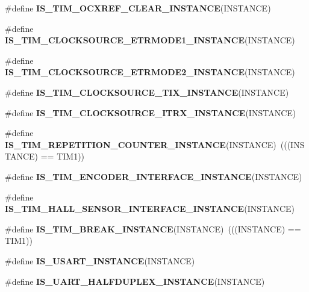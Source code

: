 \begin{DoxyCompactItemize}
\item 
\#define {\bfseries I\+S\+\_\+\+T\+I\+M\+\_\+\+O\+C\+X\+R\+E\+F\+\_\+\+C\+L\+E\+A\+R\+\_\+\+I\+N\+S\+T\+A\+N\+CE}(I\+N\+S\+T\+A\+N\+CE)
\item 
\#define {\bfseries I\+S\+\_\+\+T\+I\+M\+\_\+\+C\+L\+O\+C\+K\+S\+O\+U\+R\+C\+E\+\_\+\+E\+T\+R\+M\+O\+D\+E1\+\_\+\+I\+N\+S\+T\+A\+N\+CE}(I\+N\+S\+T\+A\+N\+CE)
\item 
\#define {\bfseries I\+S\+\_\+\+T\+I\+M\+\_\+\+C\+L\+O\+C\+K\+S\+O\+U\+R\+C\+E\+\_\+\+E\+T\+R\+M\+O\+D\+E2\+\_\+\+I\+N\+S\+T\+A\+N\+CE}(I\+N\+S\+T\+A\+N\+CE)
\item 
\#define {\bfseries I\+S\+\_\+\+T\+I\+M\+\_\+\+C\+L\+O\+C\+K\+S\+O\+U\+R\+C\+E\+\_\+\+T\+I\+X\+\_\+\+I\+N\+S\+T\+A\+N\+CE}(I\+N\+S\+T\+A\+N\+CE)
\item 
\#define {\bfseries I\+S\+\_\+\+T\+I\+M\+\_\+\+C\+L\+O\+C\+K\+S\+O\+U\+R\+C\+E\+\_\+\+I\+T\+R\+X\+\_\+\+I\+N\+S\+T\+A\+N\+CE}(I\+N\+S\+T\+A\+N\+CE)
\item 
\mbox{\label{group___exported__macros_ga3b470612fd4c4e29fb985247056b1e07}} 
\#define {\bfseries I\+S\+\_\+\+T\+I\+M\+\_\+\+R\+E\+P\+E\+T\+I\+T\+I\+O\+N\+\_\+\+C\+O\+U\+N\+T\+E\+R\+\_\+\+I\+N\+S\+T\+A\+N\+CE}(I\+N\+S\+T\+A\+N\+CE)~(((I\+N\+S\+T\+A\+N\+CE) == T\+I\+M1))
\item 
\#define {\bfseries I\+S\+\_\+\+T\+I\+M\+\_\+\+E\+N\+C\+O\+D\+E\+R\+\_\+\+I\+N\+T\+E\+R\+F\+A\+C\+E\+\_\+\+I\+N\+S\+T\+A\+N\+CE}(I\+N\+S\+T\+A\+N\+CE)
\item 
\#define {\bfseries I\+S\+\_\+\+T\+I\+M\+\_\+\+H\+A\+L\+L\+\_\+\+S\+E\+N\+S\+O\+R\+\_\+\+I\+N\+T\+E\+R\+F\+A\+C\+E\+\_\+\+I\+N\+S\+T\+A\+N\+CE}(I\+N\+S\+T\+A\+N\+CE)
\item 
\mbox{\label{group___exported__macros_ga68b8d9ca22720c9034753c604d83500d}} 
\#define {\bfseries I\+S\+\_\+\+T\+I\+M\+\_\+\+B\+R\+E\+A\+K\+\_\+\+I\+N\+S\+T\+A\+N\+CE}(I\+N\+S\+T\+A\+N\+CE)~(((I\+N\+S\+T\+A\+N\+CE) == T\+I\+M1))
\item 
\#define {\bfseries I\+S\+\_\+\+U\+S\+A\+R\+T\+\_\+\+I\+N\+S\+T\+A\+N\+CE}(I\+N\+S\+T\+A\+N\+CE)
\item 
\#define {\bfseries I\+S\+\_\+\+U\+A\+R\+T\+\_\+\+H\+A\+L\+F\+D\+U\+P\+L\+E\+X\+\_\+\+I\+N\+S\+T\+A\+N\+CE}(I\+N\+S\+T\+A\+N\+CE)
\item 
\mbox{\label{group___exported__macros_ga14e4b19f7c750110f6c27cf26347ba45}} 

\end{DoxyCompactItemize}
